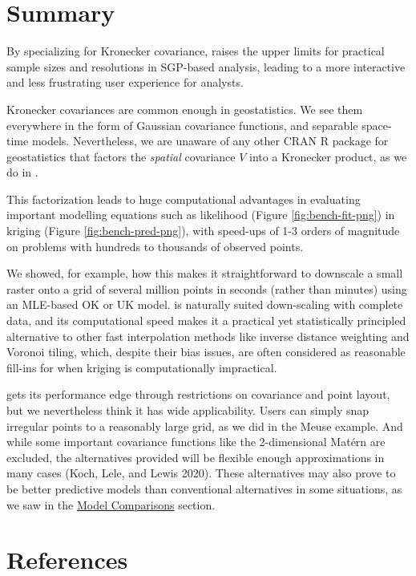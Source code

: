 \hypertarget{summary}{%
\section{Summary}\label{summary}}

By specializing for Kronecker covariance,  raises the upper limits for practical sample sizes and resolutions in SGP-based analysis, leading to a more interactive and less frustrating user experience for analysts.

Kronecker covariances are common enough in geostatistics. We see them everywhere in the form of Gaussian covariance functions, and separable space-time models. Nevertheless, we are unaware of any other CRAN R package for geostatistics that factors the \emph{spatial} covariance \(V\) into a Kronecker product, as we do in .

This factorization leads to huge computational advantages in evaluating important modelling equations such as likelihood (Figure \ref{fig:bench-fit-png}) in kriging (Figure \ref{fig:bench-pred-png}), with speed-ups of 1-3 orders of magnitude on problems with hundreds to thousands of observed points.

We showed, for example, how this makes it straightforward to downscale a small raster onto a grid of several million points in seconds (rather than minutes) using an MLE-based OK or UK model.  is naturally suited down-scaling with complete data, and its computational speed makes it a practical yet statistically principled alternative to other fast interpolation methods like inverse distance weighting and Voronoi tiling, which, despite their bias issues, are often considered as reasonable fill-ins for when kriging is computationally impractical.

 gets its performance edge through restrictions on covariance and point layout, but we nevertheless think it has wide applicability. Users can simply snap irregular points to a reasonably large grid, as we did in the Meuse example. And while some important covariance functions like the 2-dimensional Matérn are excluded, the alternatives provided will be flexible enough approximations in many cases (Koch, Lele, and Lewis 2020). These alternatives may also prove to be better predictive models than conventional alternatives in some situations, as we saw in the \protect\hyperlink{model-comparisons}{Model Comparisons} section.

\hypertarget{references}{%
\section*{References}\label{references}}

